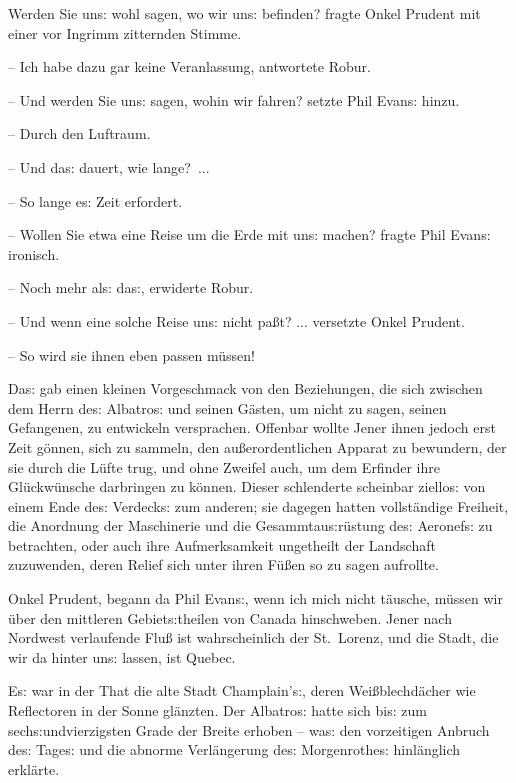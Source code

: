 \documentclass[oneside,12pt]{book}
\newcommand{\s}{s:}
\begin{document}
{\glqq}Werden Sie un{\s} wohl sagen, wo wir un{\s} befinden? fragte
Onkel Prudent mit einer vor Ingrimm zitternden Stimme.

-- Ich habe dazu gar keine Veranlassung, antwortete Robur.

-- Und werden Sie un{\s} sagen, wohin wir fahren? setzte Phil
Evan{\s} hinzu.

-- Durch den Luftraum.

-- Und da{\s} dauert, wie lange?~...

-- So lange e{\s} Zeit erfordert.

-- Wollen Sie etwa eine Reise um die Erde mit un{\s} machen? fragte
Phil Evan{\s} ironisch.

-- Noch mehr al{\s} da{\s}, erwiderte Robur.

-- Und wenn eine solche Reise un{\s} nicht pa{\ss}t? ... versetzte
Onkel Prudent.

-- So wird sie ihnen eben passen m\"ussen!{\grqq}

Da{\s} gab einen kleinen Vorgeschmack von den Beziehungen, die sich
zwischen dem Herrn de{\s} {\glqq}Albatro{\s}{\grqq} und seinen
G\"asten, um nicht zu sagen, seinen Gefangenen, zu entwickeln
versprachen. Offenbar wollte Jener ihnen jedoch erst Zeit g\"onnen,
sich zu sammeln, den au{\ss}erordentlichen Apparat zu bewundern, der
sie durch die L\"ufte trug, und ohne Zweifel auch, um dem Erfinder
ihre Gl\"uckw\"unsche darbringen zu k\"onnen. Dieser schlenderte
scheinbar ziello{\s} von einem Ende de{\s} Verdeck{\s} zum anderen;
sie dagegen hatten vollst\"andige Freiheit, die Anordnung der
Maschinerie und die Gesammtau{\s}r\"ustung de{\s}
{\glqq}Aeronef{\s}{\grqq} zu betrachten, oder auch ihre
Aufmerksamkeit ungetheilt der Landschaft zuzuwenden, deren Relief
sich unter ihren F\"u{\ss}en so zu sagen aufrollte.

{\glqq}Onkel Prudent, begann da Phil Evan{\s}, wenn ich mich nicht
t\"ausche, m\"ussen wir \"uber den mittleren Gebiet{\s}theilen von
Canada hinschweben. Jener nach Nordwest verlaufende Flu{\ss} ist
wahrscheinlich der St.~Lorenz, und die Stadt, die wir da hinter
un{\s} lassen, ist Quebec.{\grqq}

E{\s} war in der That die alte Stadt Champlain'{\s}, deren
Wei{\ss}blechd\"acher wie Reflectoren in der Sonne gl\"anzten. Der
{\glqq}Albatro{\s}{\grqq} hatte sich bi{\s} zum sech{\s}undvierzigsten
Grade der Breite erhoben -- wa{\s} den vorzeitigen Anbruch de{\s}
Tage{\s} und die abnorme Verl\"angerung de{\s} Morgenrothe{\s}
hinl\"anglich erkl\"arte.
\end{document}
